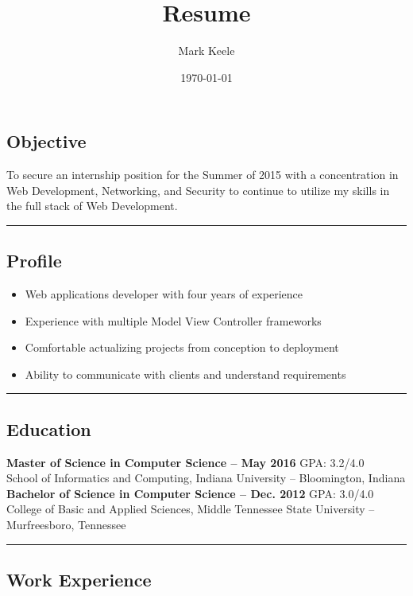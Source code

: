 \documentclass[12pt,letterpaper]{article}
\author{Mark Keele}
\title{Resume}
\date{\today}
\begin{document}
\subsection*{Objective}
To secure an internship position for the Summer of 2015 with a concentration
in Web Development, Networking, and Security to continue to utilize my skills
in the full stack of Web Development.


\noindent\rule{7.5in}{0.4pt}

\subsection*{Profile}

\begin{itemize}

  \item Web applications developer with four years of experience

  \item Experience with multiple Model View Controller frameworks

  \item Comfortable actualizing projects from conception to deployment

  \item Ability to communicate with clients and understand requirements

\end{itemize}


\noindent\rule{7.5in}{0.4pt}

\subsection*{Education}

\textbf{Master of Science in Computer Science -- May 2016}
\hfill{GPA: 3.2/4.0} \\
\bigskip School of Informatics and Computing, Indiana University -- Bloomington, Indiana \\
\noindent\textbf{Bachelor of Science in Computer Science -- Dec. 2012}
\hfill{GPA: 3.0/4.0}\\
College of Basic and Applied Sciences, Middle Tennessee State University -- Murfreesboro, Tennessee

\noindent\rule{7.5in}{0.4pt}


\subsection*{Work Experience}
\end{document}
